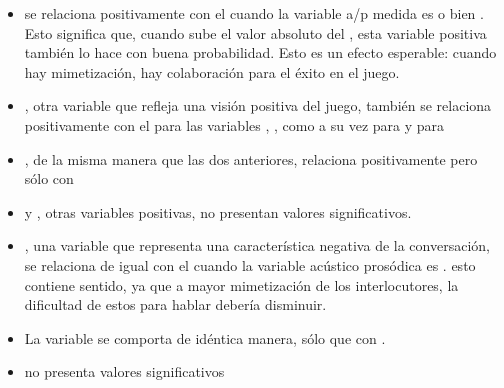 \begin{itemize}
  \item \svcontributes se relaciona positivamente con el \absentrainment cuando la variable a/p medida es \FOMEAN o bien \NOISETOHARMONICS. Esto significa que, cuando sube el valor absoluto del \entrainment, esta variable positiva también lo hace con buena probabilidad. Esto es un efecto esperable: cuando hay mimetización, hay colaboración para el éxito en el juego.
  \item \svclear, otra variable que refleja una visión positiva del juego, también se relaciona positivamente con el \absentrainment para las variables \FOMEAN, \NOISETOHARMONICS, \ENGMAX como a su vez para \PHONAVG y para \SYLCOUNT
  \item \svengaged, de la misma manera que las dos anteriores, relaciona positivamente pero sólo con \FOMEAN
  \item \svplanning y \svencourages, otras variables positivas, no presentan valores significativos.
  \item \svdifficult, una variable que representa una característica negativa de la conversación, se relaciona de igual con el \absentrainment cuando la variable acústico prosódica es \ENGMAX. esto contiene sentido, ya que a mayor mimetización de los interlocutores, la dificultad de estos para hablar debería disminuir.
  \item La variable \svbored se comporta de idéntica manera, sólo que con \FOMEAN.
  \item \svdislikes no presenta valores significativos
\end{itemize}



